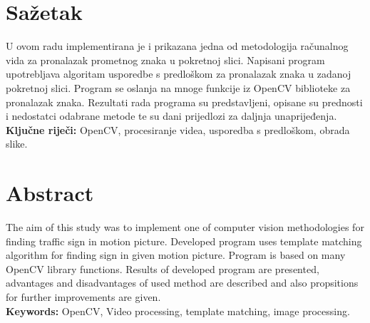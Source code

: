 \newpage
\thispagestyle{empty}

\section*{Sažetak} %
\label{sec:Sažetak}

U ovom radu implementirana je i prikazana jedna od metodologija
računalnog vida za pronalazak prometnog znaka u pokretnoj slici.
Napisani program upotrebljava algoritam usporedbe s predloškom za
pronalazak znaka u zadanoj pokretnoj slici. Program se oslanja na mnoge
funkcije iz OpenCV biblioteke za pronalazak znaka. Rezultati rada
programa su predstavljeni, opisane su prednosti i nedostatci odabrane
metode te su dani prijedlozi za daljnja unaprijeđenja.
\\[0.5cm]

\noindent\textbf{Ključne riječi:} OpenCV, procesiranje videa, usporedba
s predloškom, obrada slike.

\section*{Abstract} %
\label{sec:Abstract}

The aim of this study was to implement one of computer vision
methodologies for finding traffic sign in motion picture. Developed
program uses template matching algorithm for finding sign in given
motion picture. Program is based on many OpenCV library functions. 
Results of developed program are presented, advantages and
disadvantages of used method are described and also propsitions for
further improvements are given.
\\[0.5cm]

\noindent\textbf{Keywords:} OpenCV, Video processing, template matching,
image processing.

